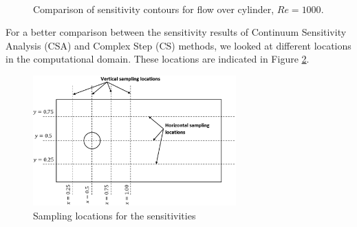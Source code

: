 \documentclass[12pt]{aiaa-pretty}
\begin{document}
\begin{figure}[H]
{	}
	\\
	\quad
	\caption{Comparison of sensitivity contours for flow over cylinder, $Re = 1000$.}
	\label{fig:cylinderSensitivityContourRE1000}
\end{figure}
%

For a better comparison between the sensitivity results of Continuum Sensitivity Analysis (CSA) and Complex Step (CS) methods, we looked at different locations in the computational domain. These locations are indicated in Figure \ref{fig:cylinderSampleLocations}.

%
\begin{figure}[H]
	\centering
	\includegraphics[height=5.0cm]{figure/cylinder/sampling_location.png}
	\caption{Sampling locations for the sensitivities}
	\label{fig:cylinderSampleLocations}
\end{figure}
%
\end{document}
